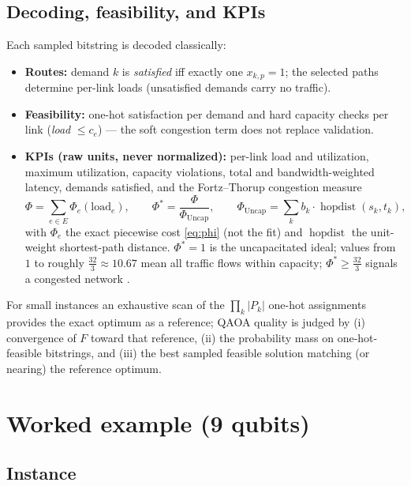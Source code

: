 \documentclass[11pt]{article}
\newcommand{\Uncap}{\mathrm{Uncap}}
\begin{document}
\subsection{Decoding, feasibility, and KPIs}
\label{sec:decode}

Each sampled bitstring is decoded classically:
\begin{itemize}
  \item \textbf{Routes:} demand $k$ is \emph{satisfied} iff exactly one
        $x_{k,p} = 1$; the selected paths determine per-link loads
        (unsatisfied demands carry no traffic).
  \item \textbf{Feasibility:} one-hot satisfaction per demand and hard
        capacity checks per link (\emph{load} $\le c_e$) --- the soft
        congestion term does not replace validation.
  \item \textbf{KPIs (raw units, never normalized):} per-link
        load and utilization, maximum utilization, capacity violations,
        total and bandwidth-weighted latency, demands satisfied, and the
        Fortz--Thorup congestion measure
        \begin{equation}
          \Phi = \sum_{e \in E} \Phi_e(\mathrm{load}_e),
          \qquad
          \Phi^{*} = \frac{\Phi}{\Phi_{\Uncap}},
          \qquad
          \Phi_{\Uncap} = \sum_{k} b_k \cdot \operatorname{hopdist}(s_k, t_k),
        \end{equation}
        with $\Phi_e$ the exact piecewise cost \eqref{eq:phi} (not the fit)
        and $\operatorname{hopdist}$ the unit-weight shortest-path distance.
        $\Phi^{*} = 1$ is the uncapacitated ideal; values from $1$ to roughly
        $\tfrac{32}{3} \approx 10.67$ mean all traffic flows within capacity;
        $\Phi^{*} \ge \tfrac{32}{3}$ signals a congested network
        \cite{fortz2000}.
\end{itemize}
For small instances an exhaustive scan of the $\prod_k |P_k|$ one-hot
assignments provides the exact optimum as a reference; QAOA quality is judged
by (i) convergence of $F$ toward that reference, (ii) the probability mass on
one-hot-feasible bitstrings, and (iii) the best sampled feasible solution
matching (or nearing) the reference optimum.

\section{Worked example (9 qubits)}
\label{sec:example}

\subsection{Instance}
\end{document}
